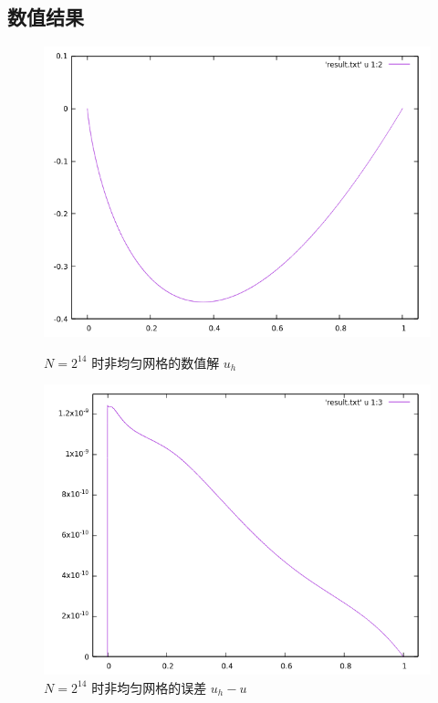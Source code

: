 \documentclass[lang=cn,11pt,a4paper]{elegantpaper}
\begin{document}
\subsection{数值结果}

\begin{figure}[H]
    \centering
    \begin{minipage}[t]{0.48\textwidth}
        \centering
        \includegraphics[width=0.9\linewidth]{png/p1-solution}
        \caption{\small $N=2^{14}$ 时非均匀网格的数值解 $u_h$}
    \end{minipage}
    \hspace{1em}
    \begin{minipage}[t]{0.48\textwidth}
        \centering
        \includegraphics[width=0.9\linewidth]{png/p1-error}
        \caption{\small $N=2^{14}$ 时非均匀网格的误差 $u_h-u$}
    \end{minipage}
\end{figure}
\end{document}
